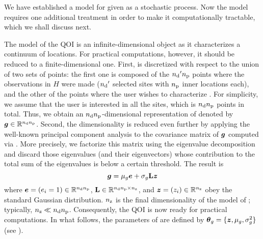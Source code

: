 We have established a model for \g given as a stochastic process. Now the
model requires one additional treatment in order to make it computationally
tractable, which we shall discuss next.

The model of the \ac{QOI} is an infinite-dimensional object as it characterizes
a continuum of locations. For practical computations, however, it should be
reduced to a finite-dimensional one. First, \g is discretized with respect to
the union of two sets of points: the first one is composed of the ${n_\mathrm{d}}' {n_\mathrm{p}}$
points where the observations in $H$ were made (${n_\mathrm{d}}'$ selected sites with ${n_\mathrm{p}}$
inner locations each), and the other of the points where the user wishes to
characterize \g. For simplicity, we assume that the user is interested in all
the sites, which is ${n_\mathrm{d}} {n_\mathrm{p}}$ points in total. Thus, we obtain an ${n_\mathrm{d}}
{n_\mathrm{p}}$-dimensional representation of \g denoted by $\boldsymbol{g} \in \mathbb{R}^{{n_\mathrm{d}} {n_\mathrm{p}}}$.
Second, the dimensionality is reduced even further by applying the well-known
principal component analysis to the covariance matrix of $\boldsymbol{g}$ computed via
. More precisely, we factorize this matrix using the
eigenvalue decomposition \cite{press2007} and discard those eigenvalues (and
their eigenvectors) whose contribution to the total sum of the eigenvalues is
below a certain threshold. The result is
\begin{equation} \elab{kl-approximation}
  \vg = \mu_\g \v{e} + \sigma_\g \m{L} \vz
\end{equation}
where $\boldsymbol{e} = (e_i = 1) \in \mathbb{R}^{{n_\mathrm{d}} {n_\mathrm{p}}}$, $\mathbf{L} \in \mathbb{R}^{{n_\mathrm{d}} {n_\mathrm{p}} \times
{n_\mathrm{z}}}$, and $\boldsymbol{z} = (z_i) \in \mathbb{R}^{n_\mathrm{z}}$ obey the standard Gaussian distribution.
${n_\mathrm{z}}$ is the final dimensionality of the model of \g; typically, ${n_\mathrm{z}} \ll {n_\mathrm{d}}
{n_\mathrm{p}}$. Consequently, the \ac{QOI} is now ready for practical computations. In
what follows, the parameters of  are defined by $\boldsymbol{\theta}_g = \{ \boldsymbol{z},
\mu_g, \sigma^2_g \}$ (see ).

